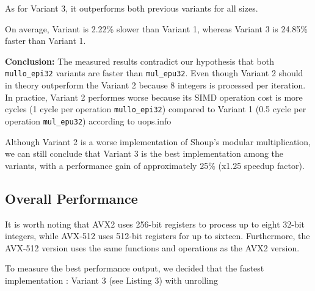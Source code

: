 \documentclass{article}
\newcommand{\pointlabel}[1]{\par\smallskip\noindent\textbf{\textcolor{accentorange}{#1:}} }
\begin{document}
As for Variant 3, it outperforms both previous variants for all sizes.

On average, Variant is 2.22\% slower than Variant 1, whereas Variant 3 is 24.85\% faster than Variant 1.

\pointlabel{Conclusion}The measured results contradict our hypothesis that both \texttt{mullo\_epi32} variants are faster than \texttt{mul\_epu32}. Even though Variant 2 should in theory outperform the Variant 2 because 8 integers is processed per iteration. In practice, Variant 2 performes worse because its SIMD operation cost is more cycles (1 cycle per operation \texttt{mullo\_epi32}) compared to Variant 1 (0.5 cycle per operation \texttt{mul\_epu32}) according to uops.info \cite{uopsInfoTable}

Although Variant 2 is a worse implementation of Shoup's modular multiplication, we can still conclude that Variant 3 is the best implementation among the variants, with a performance gain of approximately 25\% (x1.25 speedup factor).

\newpage
\subsection{Overall Performance}
It is worth noting that AVX2 uses 256-bit registers to process up to eight 32-bit integers, while AVX-512 uses 512-bit registers for up to sixteen. Furthermore, the AVX-512 version uses the same functions and operations as the AVX2 version.

To measure the best performance output, we decided that the fastest implementation : Variant 3 (see Listing 3) with unrolling
\end{document}
